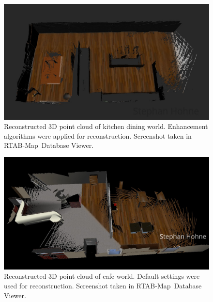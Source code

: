 \documentclass[10pt, journal, compsoc]{IEEEtran}
\newcommand{\rtab}{RTAB-Map}
\begin{document}
\begin{figure}[thpb]
      \centering
      \includegraphics[width=\textwidth]{images/3D_point_cloud_kitchen_dining_settings_enhanced.jpg}
      \caption{Reconstructed 3D point cloud of kitchen dining world. Enhancement algorithms were applied for reconstruction. Screenshot taken in \rtab\ Database Viewer.}
      \label{fig:3d_point_cloud_kitchen_dining_enhanced}
\end{figure}

\begin{figure}[thpb]
      \centering
      \includegraphics[width=\textwidth]{images/3D_cloud_cafe.jpg}
      \caption{Reconstructed 3D point cloud of cafe world. Default settings were used for reconstruction. Screenshot taken in \rtab\ Database Viewer.}
      \label{fig:cafe_3D_default}
\end{figure}
\end{document}
